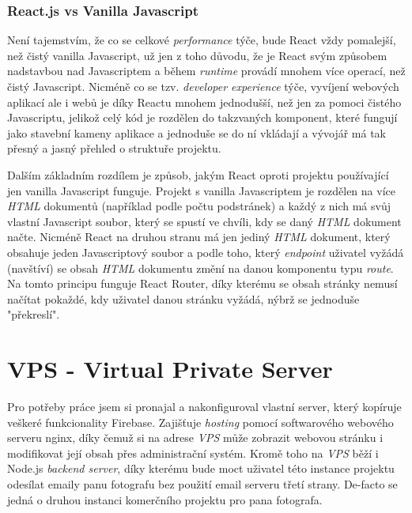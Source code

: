\documentclass[12pt,a4paper]{report}
\begin{document}
  \subsection{React.js vs Vanilla Javascript}
  Není tajemstvím, že co se celkové \emph{performance} týče, bude React vždy pomalejší, než čistý vanilla Javascript, už jen 
  z toho důvodu, že je React svým způsobem nadstavbou nad Javascriptem a během \emph{runtime} provádí mnohem více operací, než čistý Javascript.
  Nicméně co se tzv. \emph{developer experience} týče, vyvíjení webových aplikací ale i webů je díky Reactu mnohem jednodušší, než jen
  za pomoci čistého Javascriptu, jelikož celý kód je rozdělen do takzvaných komponent, které fungují jako stavební kameny aplikace a jednoduše se 
  do ní vkládají a vývojář má tak přesný a jasný přehled o struktuře projektu. 

  Dalším základním rozdílem je způsob, jakým React oproti projektu používající jen vanilla Javascript funguje.
  Projekt s vanilla Javascriptem je rozdělen na více \emph{HTML} dokumentů (například podle počtu podstránek) a každý z nich má svůj vlastní 
  Javascript soubor, který se spustí ve chvíli, kdy se daný \emph{HTML} dokument načte.
  Nicméně React na druhou stranu má jen jediný \emph{HTML} dokument, který obsahuje jeden Javascriptový soubor a podle toho,
  který \emph{endpoint} uživatel vyžádá (navštíví) se obsah \emph{HTML} dokumentu změní na danou komponentu typu \emph{route}.
  Na tomto principu funguje React Router, díky kterému se obsah stránky nemusí načítat pokaždé, kdy uživatel danou stránku vyžádá,
  nýbrž se jednoduše "překreslí".
 
  \chapter{VPS - Virtual Private Server}
   Pro potřeby práce jsem si pronajal a nakonfiguroval vlastní server, který kopíruje veškeré funkcionality
   Firebase. Zajišťuje \emph{hosting} pomocí softwarového webového serveru nginx, díky čemuž si na adrese \emph{VPS} může
   zobrazit webovou stránku i modifikovat její obsah přes administrační systém. Kromě toho na \emph{VPS} běží i Node.js \emph{backend server},
   díky kterému bude moct uživatel této instance projektu odesílat emaily panu fotografu bez použití email serveru třetí strany. 
   De-facto se jedná o druhou instanci komerčního projektu pro pana fotografa. 
\end{document}
